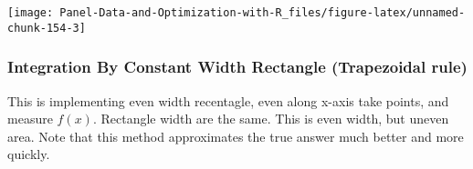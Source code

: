 \documentclass[
]{book}
\newenvironment{Shaded}{\begin{snugshade}}{\end{snugshade}}
\newcommand{\CharTok}[1]{\textcolor[rgb]{0.31,0.60,0.02}{#1}}
\newcommand{\DataTypeTok}[1]{\textcolor[rgb]{0.13,0.29,0.53}{#1}}
\newcommand{\FloatTok}[1]{\textcolor[rgb]{0.00,0.00,0.81}{#1}}
\newcommand{\KeywordTok}[1]{\textcolor[rgb]{0.13,0.29,0.53}{\textbf{#1}}}
\newcommand{\NormalTok}[1]{#1}
\newcommand{\OperatorTok}[1]{\textcolor[rgb]{0.81,0.36,0.00}{\textbf{#1}}}
\newcommand{\StringTok}[1]{\textcolor[rgb]{0.31,0.60,0.02}{#1}}
\begin{document}
\begin{Shaded}
\end{Shaded}

\begin{center}\texttt{[image: Panel-Data-and-Optimization-with-R\_files/figure-latex/unnamed-chunk-154-3]} \end{center}

\hypertarget{integration-by-constant-width-rectangle-trapezoidal-rule}{%
\subsubsection{Integration By Constant Width Rectangle (Trapezoidal rule)}\label{integration-by-constant-width-rectangle-trapezoidal-rule}}

This is implementing even width recentagle, even along x-axis take points, and measure \(f(x)\). Rectangle width are the same. This is even width, but uneven area. Note that this method approximates the true answer much better and more quickly.
\end{document}
